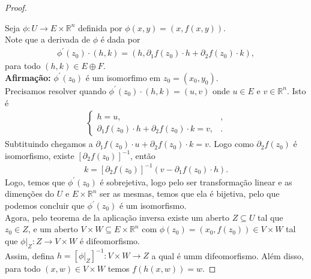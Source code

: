\begin{proof} 
  \begin{center}
      
  \end{center}
  Seja $\phi:U\to E\times\mathbb{R}^{n}$ definida por $\phi(x,y)=(x,f(x,y))$.\\
  Note que a derivada de $\phi$ é dada por
  \begin{align*}
    \phi^{\prime}(z_0)\cdot(h,k)=\left( h,\partial_{1}f(z_0)\cdot h+\partial_{2}f(z_0)\cdot k \right),
  \end{align*}
  para todo $(h,k)\in E\oplus F$.\\
  \textbf{Afirmação:} $\phi^{\prime}(z_0)$ é um isomorfimo em $z_0=(x_0,y_0)$.\\
  Precisamos resolver quando $\phi^{\prime}(z_0)\cdot(h,k)=(u,v)$ onde $u\in E$ e $v\in \mathbb{R}^{n}$. Isto é
  \begin{align*}
    \begin{cases}
      h=u, &\text{,} \\
      \partial_{1}f(z_0)\cdot h+\partial_{2}f(z_0)\cdot k=v, &.
    \end{cases}
  \end{align*}
  Subtituindo chegamos a $\partial_{1}f(z_0)\cdot u+\partial_{2}f(z_0)\cdot k=v$. Logo como $\partial_{2}f(z_0)$ é isomorfismo, existe $\left[ \partial_{2}f(z_0) \right]^{-1}$, então
  \begin{align*}
    k=\left[ \partial_{2}f(z_0) \right]^{-1}\left( v-\partial_{1}f(z_0)\cdot h \right).
  \end{align*}
  Logo, temos que $\phi^{\prime}(z_0)$ é sobrejetiva, logo pelo ser transformação linear e as dimenções do $U$ e $E\times\mathbb{R}^{n}$ ser as mesmas, temos que ela é bijetiva, pelo que podemos concluir que $\phi^{\prime}(z_0)$ é um isomorfismo.\\
  Agora, pelo teorema de la aplicação inversa existe um aberto $Z\subseteq U$ tal que $z_0\in Z$, e um aberto $V\times W\subseteq E\times\mathbb{R}^{n}$ com $\phi(z_0)=(x_0,f(z_0))\in V\times W$ tal que $\phi\big|_{Z}:Z\to V\times W$ é difeomorfismo.\\
  Assim, defina $h=\left[ \phi\big|_{Z} \right]^{-1}:V\times W\to Z$ a qual é umm difeomorfismo.
  Além disso, para todo $(x,w)\in V\times W$ temos $f(h(x,w))=w$. 
\end{proof}
